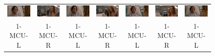 \begin{figure}
\begin{center}
\begin{tabular}{c c c c c c c}

\includegraphics[width=0.11\linewidth]
  {fig/pat1/thisIs40/01.jpg}
& \includegraphics[width=0.11\linewidth]
  {fig/pat1/thisIs40/02.jpg}
& \includegraphics[width=0.11\linewidth]
  {fig/pat1/thisIs40/03.jpg}
& \includegraphics[width=0.11\linewidth]
  {fig/pat1/thisIs40/04.jpg}
& \includegraphics[width=0.11\linewidth]
  {fig/pat1/thisIs40/05.jpg}
& \includegraphics[width=0.11\linewidth]
  {fig/pat1/thisIs40/06.jpg}
& \includegraphics[width=0.11\linewidth]
  {fig/pat1/thisIs40/07.jpg}
\\
\large{1-MCU-L} & \large{1-MCU-R} 
& \large{1-MCU-L} & \large{1-MCU-R} 
& \large{1-MCU-L} & \large{1-MCU-R} 
& \large{1-MCU-L} \\

\end{tabular}
\end{center}
\label{fig:pat1}
\end{figure}

